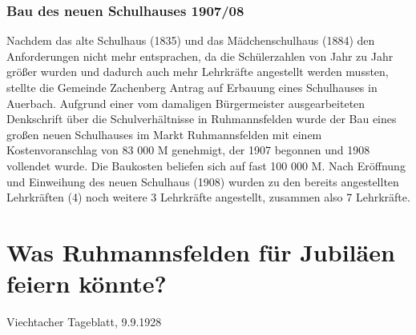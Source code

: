 \documentclass[12pt,a4paper]{book}
\begin{document}
\subsection[Bau des neuen Schulhauses 1907/08]{Bau des neuen Schulhauses
1907/08\protect\footnotemark{}\protect{}}

Nachdem das alte Schulhaus (1835) und das Mädchenschulhaus (1884) den
Anforderungen nicht mehr entsprachen, da die Schülerzahlen von Jahr zu Jahr
größer wurden und dadurch auch mehr Lehrkräfte angestellt werden mussten,
stellte die Gemeinde Zachenberg Antrag auf Erbauung eines Schulhauses in
Auerbach. Aufgrund einer vom damaligen Bürgermeister ausgearbeiteten Denkschrift
über die Schulverhältnisse in Ruhmannsfelden wurde der Bau eines großen neuen
Schulhauses im Markt Ruhmannsfelden mit einem Kostenvoranschlag von 83 000 M
genehmigt, der 1907 begonnen und 1908 vollendet wurde. Die Baukosten beliefen
sich auf fast 100 000 M. Nach Eröffnung und Einweihung des neuen Schulhaus
(1908) wurden zu den bereits angestellten Lehrkräften (4) noch weitere 3
Lehrkräfte angestellt, zusammen also 7 Lehrkräfte.

\chapter{Was Ruhmannsfelden für Jubiläen feiern könnte?}

Viechtacher Tageblatt, 9.9.1928
\end{document}
